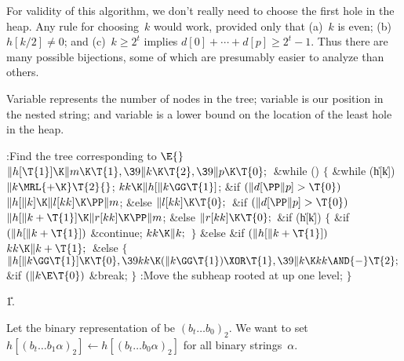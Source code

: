 For validity of this algorithm, we don't really need to choose the
first hole in the heap. Any rule for choosing~$k$ would work, provided only
that (a)~$k$ is even; (b)~$h[k/2]\ne0$; and
(c)~$k\ge 2^t$ implies $d[0]+\cdots+d[p]\ge 2^t-1$. Thus there are many
possible bijections, some of which are presumably easier
to analyze than others.

\fi

Variable  represents the number of nodes in the tree; variable %
is our position in the nested string; and variable  is a lower bound
on the location of the least hole in the heap.

\Y\B\4:Find the tree corresponding to \X${}\E{}$\6
$\|h[\T{1}]\K\|m\K\T{1},\39\|k\K\T{2},\39\|p\K\T{0};{}$\6
\&{while} ()\5
${}\{{}$\1\6
\&{while} (\|h[\|k])\1\5
${}\|k\MRL{+{\K}}\T{2}{}$;\2\6
${}\\{kk}\K\|h[\|k\GG\T{1}]{}$;\6
\&{if} ${}(\|d[\PP\|p]>\T{0}){}$\1\5
${}\|h[\|k]\K\|l[\\{kk}]\K\PP\|m{}$;\5
\2\&{else}\1\5
${}\|l[\\{kk}]\K\T{0};{}$\2\6
\&{if} ${}(\|d[\PP\|p]>\T{0}){}$\1\5
${}\|h[\|k+\T{1}]\K\|r[\\{kk}]\K\PP\|m{}$;\5
\2\&{else}\1\5
${}\|r[\\{kk}]\K\T{0};{}$\2\6
\&{if} (\|h[\|k])\5
${}\{{}$\1\6
\&{if} ${}(\|h[\|k+\T{1}]){}$\1\5
\&{continue};\2\6
${}\\{kk}\K\|k;{}$\6
\4${}\}{}$\5
\2\&{else} \&{if} ${}(\|h[\|k+\T{1}]){}$\1\5
${}\\{kk}\K\|k+\T{1};{}$\2\6
\&{else}\5
${}\{{}$\1\6
${}\|h[\|k\GG\T{1}]\K\T{0},\39\\{kk}\K(\|k\GG\T{1})\XOR\T{1},\39\|k\K\\{kk}%
\AND{-}\T{2};{}$\6
\&{if} ${}(\|k\E\T{0}){}$\1\5
\&{break};\2\6
\4${}\}{}$\2\6
:Move the subheap rooted at  up one level\X;\6
\4${}\}{}$\2\par
\U1.\fi

Let the binary representation of  be $(b_t\ldots b_0)_2$.
We want to set $h[(b_t\ldots b_1\alpha)_2]\gets h[(b_t\ldots b_0\alpha)_2]$
for all binary strings~$\alpha$.

